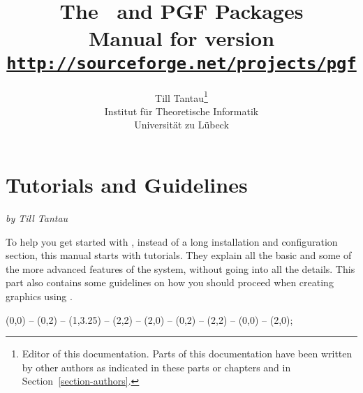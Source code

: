 \title{\bfseries The \tikzname\ and {\Large PGF} Packages\\
  \large Manual for version \pgfversion\\[1mm]
\large\href{http://sourceforge.net/projects/pgf}{\texttt{http://sourceforge.net/projects/pgf}}}
\author{Till Tantau\footnote{Editor of this documentation. Parts of
    this documentation have been written by other authors as indicated
    in these parts or chapters and in Section~\ref{section-authors}.}\\
  \normalsize Institut f\"ur Theoretische Informatik\\[-1mm]
  \normalsize Universit\"at zu L\"ubeck}

\maketitle

\tableofcontents

\clearpage




\part{Tutorials and Guidelines}

{\Large \emph{by Till Tantau}}

\bigskip
\noindent
To help you get started with \tikzname, instead of a long installation
and configuration section, this manual starts with tutorials. They
explain all the basic and some of the more advanced features of the
system, without going into all the details. This part also contains
some guidelines on how you should proceed when creating graphics using
\tikzname.

\vskip3cm

\begin{codeexample}[graphic=white,width=0pt]
\tikz \draw[thick,rounded corners=8pt]
  (0,0) -- (0,2) -- (1,3.25) -- (2,2) -- (2,0) -- (0,2) -- (2,2) -- (0,0) -- (2,0);
\end{codeexample}

% 
% 
% 
% 
% 
% 


